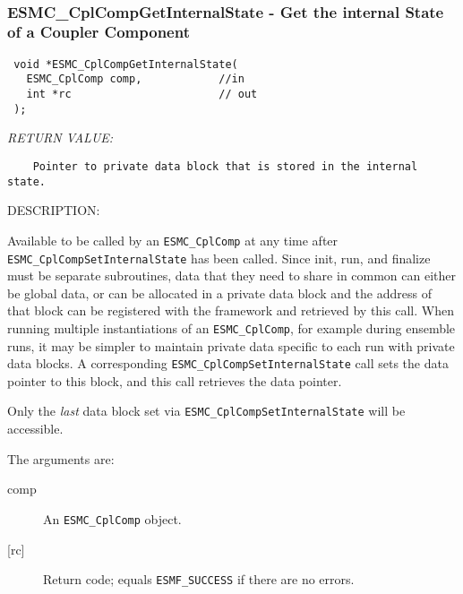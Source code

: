  
\mbox{}\hrulefill\ 
 
\subsubsection [ESMC\_CplCompGetInternalState] {ESMC\_CplCompGetInternalState - Get the internal State of a Coupler Component}


  
\begin{verbatim} void *ESMC_CplCompGetInternalState(
   ESMC_CplComp comp,            //in
   int *rc                       // out
 );\end{verbatim}{\em RETURN VALUE:}
\begin{verbatim}    Pointer to private data block that is stored in the internal state.\end{verbatim}
{\sf DESCRIPTION:\\ }


  
    Available to be called by an {\tt ESMC\_CplComp} at any time after 
    {\tt ESMC\_CplCompSetInternalState} has been called. Since init, run, and
    finalize must be separate subroutines, data that they need to share in 
    common can either be global data, or can be allocated in a private data
    block and the address of that block can be registered with the framework 
    and retrieved by this call. When running multiple instantiations of an 
    {\tt ESMC\_CplComp}, for example during ensemble runs, it may be simpler 
    to maintain private data specific to each run with private data blocks. A 
    corresponding {\tt ESMC\_CplCompSetInternalState} call sets the data
    pointer to this block, and this call retrieves the data pointer. 
  
    Only the {\em last} data block set via {\tt ESMC\_CplCompSetInternalState}
    will be accessible. 
  
    The arguments are:
    \begin{description}
    \item[comp]
      An {\tt ESMC\_CplComp} object.
    \item[{[rc]}]
      Return code; equals {\tt ESMF\_SUCCESS} if there are no errors.
   \end{description}
   
 
